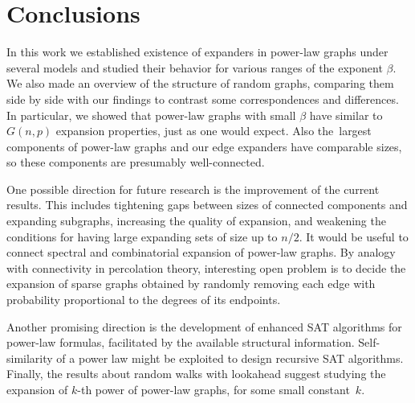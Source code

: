 \chapter{Conclusions}

In this work we established existence of expanders in power-law graphs
under several models and studied their behavior for various ranges
of the exponent $\beta$.
We also made an overview of the structure of random graphs, comparing them
side by side with our findings to contrast some correspondences and differences.
In particular, we showed that power-law graphs with small $\beta$
have similar to $G(n,p)$ expansion properties, just as one would expect.
Also the~largest components of power-law graphs and our edge expanders
have comparable sizes, so these components are presumably well-connected.

One possible direction for future research is the improvement of the current results.
This includes tightening gaps between sizes of connected components and expanding subgraphs,
increasing the quality of expansion,
and weakening the conditions for having large expanding sets of size up to $n/2$.
It would be useful to connect spectral and combinatorial expansion of power-law graphs.
By analogy with connectivity in percolation theory, interesting open problem is
to decide the expansion of sparse graphs obtained by randomly removing each edge
with probability proportional to the degrees of its endpoints.

Another promising direction is  the development of enhanced SAT algorithms
for power-law formulas, facilitated by the available structural information.
Self-similarity of a power law might be exploited to design recursive SAT algorithms.
Finally, the results about random walks with lookahead suggest studying
the expansion of $k$-th power of power-law graphs, for some small constant~$k$.
